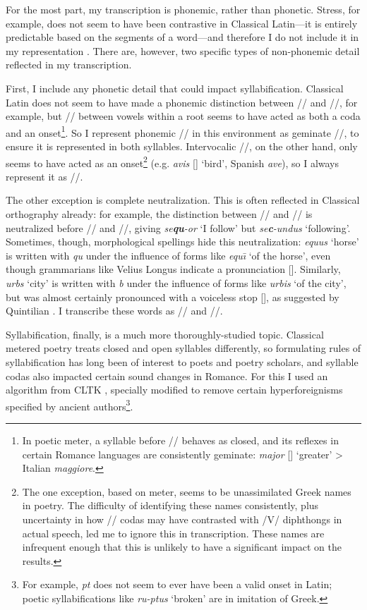 \documentclass[12pt,twoside,leqno]{article} %
\newcommand{\ipa}[1]{/\textipa{#1}/}
\newcommand{\ipab}[1]{[\textipa{#1}]}
\begin{document}
For the most part, my transcription is phonemic, rather than phonetic. Stress, for example, does not seem to have been contrastive in Classical Latin---it is entirely predictable based on the segments of a word---and therefore I do not include it in my representation \parencites[83]{allen}[I.5.30]{quintilian}. There are, however, two specific types of non-phonemic detail reflected in my transcription.

First, I include any phonetic detail that could impact syllabification. Classical Latin does not seem to have made a phonemic distinction between \ipa{j} and \ipa{jj}, for example, but \ipa{j} between vowels within a root seems to have acted as both a coda and an onset\footnote{In poetic meter, a syllable before \ipa{j} behaves as closed, and its reflexes in certain Romance languages are consistently geminate: \emph{major} \ipab{maj.jor} `greater' > Italian \emph{maggiore}.}. So I represent phonemic \ipa{j} in this environment as geminate \ipa{jj}, to ensure it is represented in both syllables. Intervocalic \ipa{w}, on the other hand, only seems to have acted as an onset\footnote{The one exception, based on meter, seems to be unassimilated Greek names in poetry. The difficulty of identifying these names consistently, plus uncertainty in how \ipa{w} codas may have contrasted with /V/ diphthongs in actual speech, led me to ignore this in transcription. These names are infrequent enough that this is unlikely to have a significant impact on the results.} (e.g. \emph{avis} \ipab{a.wis} `bird', Spanish \emph{ave}), so I always represent it as \ipa{w}.

The other exception is complete neutralization. This is often reflected in Classical orthography already: for example, the distinction between \ipa{k} and \ipa{k\super{w}} is neutralized before \ipa{u} and \ipa{u:}, giving \emph{se\textbf{qu}-or} `I follow' but \emph{se\textbf{c}-undus} `following'. Sometimes, though, morphological spellings hide this neutralization: \emph{equus} `horse' is written with \emph{qu} under the influence of forms like \emph{equ\=\i} `of the horse', even though grammarians like Velius Longus \citep[59.2-8]{longus} indicate a pronunciation \ipab{ekus}. Similarly, \emph{urbs} `city' is written with \emph{b} under the influence of forms like \emph{urbis} `of the city', but was almost certainly pronounced with a voiceless stop \ipab{urps}, as suggested by Quintilian \citep[I.7.7]{quintilian}. I transcribe these words as \ipa{ekus} and \ipa{urps}.

Syllabification, finally, is a much more thoroughly-studied topic. Classical metered poetry treats closed and open syllables differently, so formulating rules of syllabification has long been of interest to poets and poetry scholars, and syllable codas also impacted certain sound changes in Romance. For this I used an algorithm from CLTK \citep{cltk}, specially modified to remove certain hyperforeignisms specified by ancient authors\footnote{For example, \emph{pt} does not seem to ever have been a valid onset in Latin; poetic syllabifications like \emph{ru-ptus} `broken' are in imitation of Greek.}.
\end{document}
